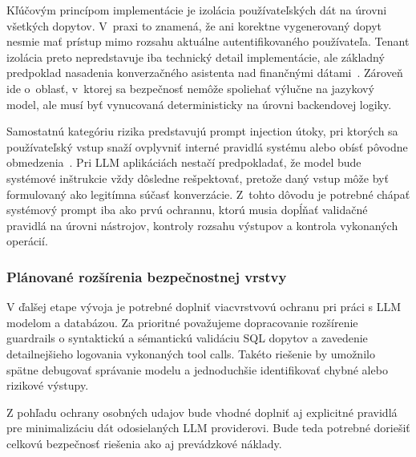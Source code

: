 Kľúčovým princípom implementácie je izolácia používateľských dát na úrovni
všetkých dopytov. V~praxi to znamená, že ani korektne vygenerovaný dopyt nesmie
mať prístup mimo rozsahu aktuálne autentifikovaného používateľa. Tenant izolácia preto
nepredstavuje iba technický detail implementácie, ale základný predpoklad
nasadenia konverzačného asistenta nad finančnými dátami~\cite{owasp2025llm}. Zároveň
ide o~oblasť, v~ktorej sa bezpečnosť nemôže spoliehať výlučne na jazykový model, ale
musí byť vynucovaná deterministicky na úrovni backendovej logiky.

Samostatnú kategóriu rizika predstavujú prompt injection útoky, pri ktorých sa
používateľský vstup snaží ovplyvniť interné pravidlá systému alebo obísť pôvodne
obmedzenia~\cite{greshake2023indirect,perez2022prompt}. Pri LLM aplikáciách nestačí
predpokladať, že model bude systémové inštrukcie vždy dôsledne rešpektovať, pretože
daný vstup môže byť formulovaný ako legitímna súčasť konverzácie. Z~tohto dôvodu
je potrebné chápať systémový prompt iba ako prvú ochrannu, ktorú musia dopĺňať validačné
pravidlá na úrovni nástrojov, kontroly rozsahu výstupov a kontrola vykonaných
operácií.

\subsubsection{Plánované rozšírenia bezpečnostnej vrstvy}

V ďalšej etape vývoja je potrebné doplniť viacvrstvovú ochranu pri práci s LLM modelom
a databázou. Za prioritné považujeme dopracovanie rozšírenie guardrails o
syntaktickú a sémantickú validáciu SQL dopytov a zavedenie detailnejšieho
logovania vykonaných tool calls. Takéto riešenie by umožnilo spätne debugovať správanie
modelu a jednoduchšie identifikovať chybné alebo rizikové výstupy.

Z pohľadu ochrany osobných udajov bude vhodné doplniť aj explicitné pravidlá pre minimalizáciu
dát odosielaných LLM providerovi. Bude teda potrebné doriešiť celkovú bezpečnosť
riešenia ako aj prevádzkové náklady.


